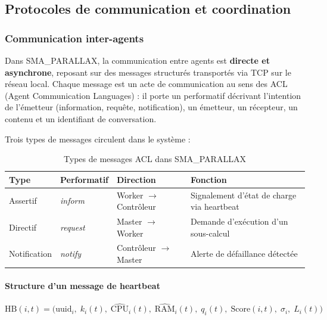 \documentclass[12pt,a4paper]{report}
\begin{document}
\subsection{Protocoles de communication et coordination}

\subsubsection{Communication inter-agents}

Dans SMA\_PARALLAX, la communication entre agents est \textbf{directe et asynchrone}, reposant sur des messages structurés transportés via TCP sur le réseau local. Chaque message est un acte de communication au sens des ACL (Agent Communication Languages) : il porte un performatif décrivant l'intention de l'émetteur (information, requête, notification), un émetteur, un récepteur, un contenu et un identifiant de conversation.

Trois types de messages circulent dans le système :

\begin{table}[H]
\centering
\renewcommand{\arraystretch}{1.3}
\begin{tabular}{|l|l|l|l|}
\hline
\textbf{Type} & \textbf{Performatif} & \textbf{Direction} & \textbf{Fonction} \\
\hline
Assertif & \textit{inform} & Worker $\rightarrow$ Contrôleur & Signalement d'état de charge via heartbeat \\
\hline
Directif & \textit{request} & Master $\rightarrow$ Worker & Demande d'exécution d'un sous-calcul \\
\hline
Notification & \textit{notify} & Contrôleur $\rightarrow$ Master & Alerte de défaillance détectée \\
\hline
\end{tabular}
\caption{Types de messages ACL dans SMA\_PARALLAX}
\label{tab:messages_acl}
\end{table}

\paragraph{Structure d'un message de heartbeat}

\[
\mathrm{HB}(i, t) = \big( \mathrm{uuid}_i,\; k_i(t),\; \widehat{\mathrm{CPU}}_i(t),\;
\widehat{\mathrm{RAM}}_i(t),\; q_i(t),\; \mathrm{Score}(i,t),\; \sigma_i,\; L_i(t) \big)
\]
\end{document}
